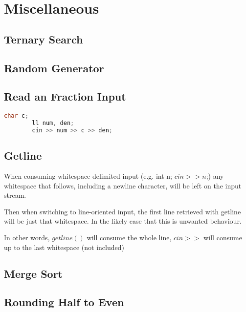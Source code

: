 \chapter{Miscellaneous}

\section{Ternary Search}


\section{Random Generator}


\section{Read an Fraction Input}

    \begin{lstlisting}[language=c++]
        char c;
        ll num, den;
        cin >> num >> c >> den;
    \end{lstlisting}

\section{Getline}

    When consuming whitespace-delimited input (e.g. int n; $cin >> n$;) any whitespace that follows, 
    including a newline character, will be left on the input stream. 

    Then when switching to line-oriented input, the first line retrieved with getline will be just that whitespace. In the likely case that this is unwanted behaviour.

    In other words, $getline()$ will consume the whole line, $cin>>$ will consume up to the last whitespace (not included) 


\section{Merge Sort}


\section{Rounding Half to Even}

